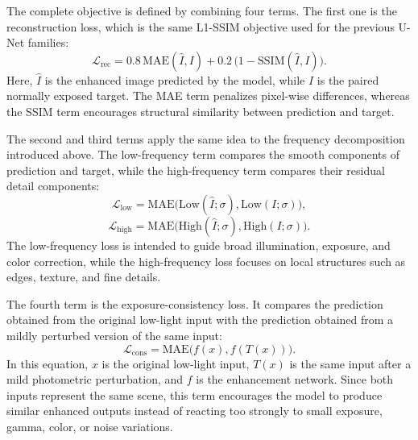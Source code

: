 The complete objective is defined by combining four terms. The first one is the reconstruction loss, which is the same L1-SSIM objective used for the previous U-Net families:
\begin{equation}
	\mathcal{L}_{\mathrm{rec}}
	=
	0.8\,\mathrm{MAE}(\hat{I}, I)
	+
	0.2\,\bigl(1-\mathrm{SSIM}(\hat{I}, I)\bigr).
	\label{eq:fac_ecl_rec_loss}
\end{equation}
Here, $\hat{I}$ is the enhanced image predicted by the model, while $I$ is the paired normally exposed target. The MAE term penalizes pixel-wise differences, whereas the SSIM term encourages structural similarity between prediction and target.

The second and third terms apply the same idea to the frequency decomposition introduced above. The low-frequency term compares the smooth components of prediction and target, while the high-frequency term compares their residual detail components:
\begin{equation}
	\mathcal{L}_{\mathrm{low}}
	=
	\mathrm{MAE}
	\bigl(
	\mathrm{Low}(\hat{I};\sigma),
	\mathrm{Low}(I;\sigma)
	\bigr),
	\label{eq:fac_ecl_low_loss}
\end{equation}
\begin{equation}
	\mathcal{L}_{\mathrm{high}}
	=
	\mathrm{MAE}
	\bigl(
	\mathrm{High}(\hat{I};\sigma),
	\mathrm{High}(I;\sigma)
	\bigr).
	\label{eq:fac_ecl_high_loss}
\end{equation}
The low-frequency loss is intended to guide broad illumination, exposure, and color correction, while the high-frequency loss focuses on local structures such as edges, texture, and fine details.

The fourth term is the exposure-consistency loss. It compares the prediction obtained from the original low-light input with the prediction obtained from a mildly perturbed version of the same input:
\begin{equation}
	\mathcal{L}_{\mathrm{cons}}
	=
	\mathrm{MAE}
	\bigl(
	f(x),
	f(T(x))
	\bigr).
	\label{eq:fac_ecl_cons_loss}
\end{equation}
In this equation, $x$ is the original low-light input, $T(x)$ is the same input after a mild photometric perturbation, and $f$ is the enhancement network. Since both inputs represent the same scene, this term encourages the model to produce similar enhanced outputs instead of reacting too strongly to small exposure, gamma, color, or noise variations.

